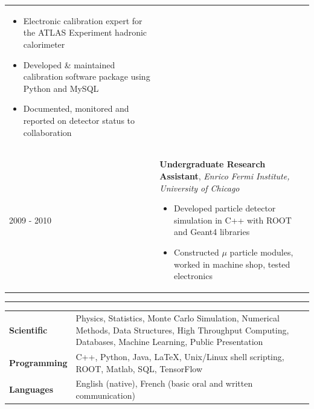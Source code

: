 \documentclass{letter}
\begin{document}
\begin{tabular}{p{}p{}}
\begin{itemize}
		\itemsep0em
		\renewcommand{\labelitemi}{\tiny$\blacksquare$} 
   		\item Electronic calibration expert for the ATLAS Experiment hadronic calorimeter
   		\item Developed \& maintained calibration software package using Python and MySQL
    		\item Documented, monitored and reported on detector status to collaboration
	\end{itemize}
\\
	2009 - 2010
	&
	\textbf{Undergraduate Research Assistant}, \textit{Enrico Fermi Institute, University of Chicago} \newline
	\vspace{-15pt}      %
	\begin{itemize}
		\itemsep0em
		\renewcommand{\labelitemi}{\tiny$\blacksquare$} 
   		\item Developed particle detector simulation in C++ with ROOT and Geant4 libraries
   		\item Constructed $\mu$ particle modules, worked in machine shop, tested electronics 
	\end{itemize}
\end{tabular}

\vspace{-10pt}

\begin{flushleft}
\Large{\textsc{\textbf{\color{Maroon}{Skills}}}}
\vspace{1pt} %
\hrule
\end{flushleft}

\begin{tabular}{p{}p{}}
	{\bf Scientific} 
	&
	Physics, Statistics, Monte Carlo Simulation, Numerical Methods, Data Structures, High Throughput Computing, Databases, Machine Learning, Public Presentation \newline
\\
	{\bf Programming} 
	&
	C++, Python, Java, \LaTeX{}, Unix/Linux shell scripting, ROOT, Matlab, SQL, TensorFlow \newline
\\ 
	{\bf Languages}
	&
	English (native), French (basic oral and written communication)
\end{tabular}
\end{document}
